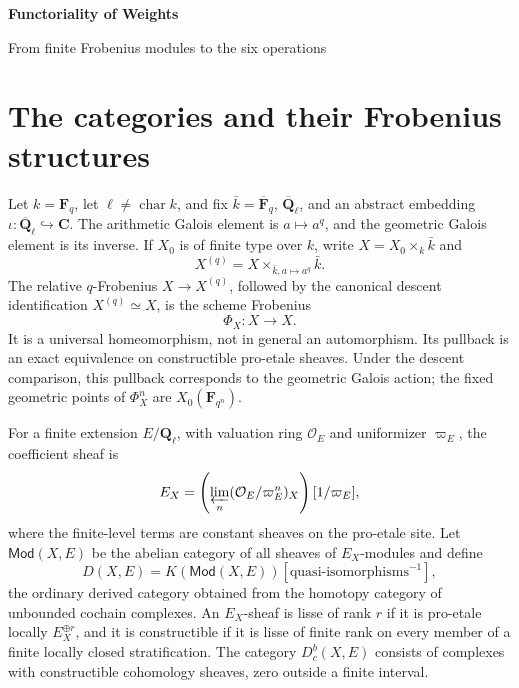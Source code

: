 \documentclass[10pt]{article}
\theoremstyle{definition}
\newcommand{\Fq}{\mathbf F_q}
\newcommand{\Fbar}{\overline{\mathbf F}_q}
\newcommand{\Ql}{\mathbf Q_\ell}
\newcommand{\Qlb}{\overline{\mathbf Q}_\ell}
\newcommand{\Dbc}{D^b_c}
\begin{document}
\begin{center}
{\large\bfseries Functoriality of Weights\par}
\medskip
{\normalsize From finite Frobenius modules to the six operations\par}
\end{center}

\begin{abstract}
This note states the weight estimates attached to the six operations.  It
keeps the essential asymmetry visible: pullback and exceptional direct image
preserve upper bounds, while exceptional pullback and ordinary direct image
preserve lower bounds.  The stronger statements for proper or smooth maps
are stated separately.  All categories are ordinary triangulated categories
of strict Weil complexes.
\end{abstract}
\tableofcontents

\section{The categories and their Frobenius structures}

Let \(k=\Fq\), let \(\ell\ne\operatorname{char}k\), and fix
\(\bar k=\Fbar\), \(\Qlb\), and an abstract embedding
\(\iota:\Qlb\hookrightarrow\mathbf C\).  The arithmetic Galois element is
\(a\mapsto a^q\), and the geometric Galois element is its inverse.  If
\(X_0\) is of finite type over \(k\), write \(X=X_0\times_k\bar k\) and
\[
 X^{(q)}=X\times_{\bar k,a\mapsto a^q}\bar k.
\]
The relative \(q\)-Frobenius \(X\to X^{(q)}\), followed by the canonical
descent identification \(X^{(q)}\simeq X\), is the scheme Frobenius
\[
                         \Phi_X:X\longrightarrow X.
\]
It is a universal homeomorphism, not in general an automorphism.  Its
pullback is an exact equivalence on constructible pro-etale sheaves.  Under
the descent comparison, this pullback corresponds to the geometric Galois
action; the fixed geometric points of \(\Phi_X^n\) are
\(X_0(\mathbf F_{q^n})\).

For a finite extension \(E/\Ql\), with valuation ring \(\mathcal O_E\) and
uniformizer \(\varpi_E\), the coefficient sheaf is
\[
 E_X=\left(\varprojlim_n
    (\mathcal O_E/\varpi_E^n)_X\right)[1/\varpi_E],
\]
where the finite-level terms are constant sheaves on the pro-etale site.
Let \(\mathsf{Mod}(X,E)\) be the abelian category of all sheaves of
\(E_X\)-modules and define
\[
 D(X,E)=K(\mathsf{Mod}(X,E))
       [\text{quasi-isomorphisms}^{-1}],
\]
the ordinary derived category obtained from the homotopy category of
unbounded cochain complexes.  An \(E_X\)-sheaf is lisse of rank \(r\) if it is pro-etale locally
\(E_X^{\oplus r}\), and it is constructible if it is lisse of finite rank
on every member of a finite locally closed stratification.  The category
\(\Dbc(X,E)\) consists of complexes with constructible cohomology sheaves,
zero outside a finite interval.
\end{document}

